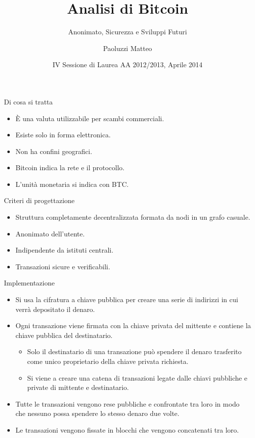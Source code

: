 \documentclass[italian]{beamer}
\title[Bitcoin]{Analisi di Bitcoin}
\subtitle{Anonimato, Sicurezza e Sviluppi Futuri}
\author[Paoluzzi Matteo]{Paoluzzi Matteo}
\institute[UniUD]{Università degli Studi di Udine\and{}Relatore:\\{}Prof. Ivan Scagnetto}
\date[2014/04/03]{IV Sessione di Laurea AA 2012/2013, Aprile 2014}
\begin{document}
\frame{\titlepage}

\begin{frame}{Di cosa si tratta}
\begin{itemize}
 \item È una valuta utilizzabile per scambi commerciali.
 \item Esiste solo in forma elettronica.
 \item Non ha confini geografici.
 \item Bitcoin indica la rete e il protocollo.
 \item L'unità monetaria si indica con BTC.
\end{itemize}
\end{frame}

\begin{frame}{Criteri di progettazione}
\begin{itemize}
 \item Struttura completamente decentralizzata formata da nodi in un grafo casuale.
 \item Anonimato dell'utente.
 \item Indipendente da istituti centrali.
 \item Transazioni sicure e verificabili.
\end{itemize}
\end{frame}

\begin{frame}{Implementazione}
\begin{itemize}
 \item Si usa la cifratura a chiave pubblica per creare una serie di indirizzi in cui verrà depositato il denaro.
 \item Ogni transazione viene firmata con la chiave privata del mittente e contiene la chiave pubblica del destinatario.
 \begin{itemize}
    \item Solo il destinatario di una transazione può spendere il denaro trasferito come unico proprietario della chiave privata richiesta.
    \item Si viene a creare una catena di transazioni legate dalle chiavi pubbliche e private di mittente e destinatario.
 \end{itemize}
 \item Tutte le transazioni vengono rese pubbliche e confrontate tra loro in modo che nessuno possa spendere lo stesso denaro due volte.
 \item Le transazioni vengono fissate in blocchi che vengono concatenati tra loro.
\end{itemize}
\end{frame}
\end{document}
